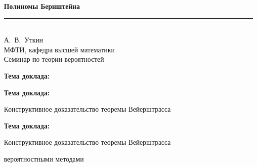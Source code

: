 \documentclass[11pt]{article}
\begin{document}
\vspace*{\fill}
\begin{center}
{\color{notaeYELLOW}\bfseries\fontsize{56}{64}\selectfont Полиномы Бернштейна}\\[0.5em]
{\color{notaeGOLD}\rule{6.4in}{1.5pt}}\\[1.3em]
{\color{notaeTEXT}\fontsize{34}{40}\selectfont А.~В.~Уткин}\\[0.5em]
{\color{notaeMUTED}\fontsize{24}{29}\selectfont МФТИ, кафедра высшей математики}\\[1.1em]
{\color{notaeBLUE}\fontsize{26}{31}\selectfont Семинар по теории вероятностей}\\[0.4em]
{\color{notaeMUTED}\fontsize{22}{27}}
\end{center}
\vspace*{\fill}

\newpage

\begin{center}
{\color{notaeYELLOW}\bfseries\fontsize{44}{52}\selectfont Тема доклада:}
\end{center}
\vspace*{\fill}
\begin{center}
\fontsize{36}{43}\selectfont
\end{center}
\vspace*{\fill}

\newpage

\begin{center}
{\color{notaeYELLOW}\bfseries\fontsize{44}{52}\selectfont Тема доклада:}
\end{center}
\vspace*{\fill}
\begin{center}
\fontsize{36}{43}\selectfont
Конструктивное доказательство теоремы Вейерштрасса\par\vspace{0.4in}
\end{center}
\vspace*{\fill}

\newpage

\begin{center}
{\color{notaeYELLOW}\bfseries\fontsize{44}{52}\selectfont Тема доклада:}
\end{center}
\vspace*{\fill}
\begin{center}
\fontsize{36}{43}\selectfont
Конструктивное доказательство теоремы Вейерштрасса\par\vspace{0.4in}
вероятностными методами\par\vspace{0.4in}
\end{center}
\vspace*{\fill}
\end{document}
